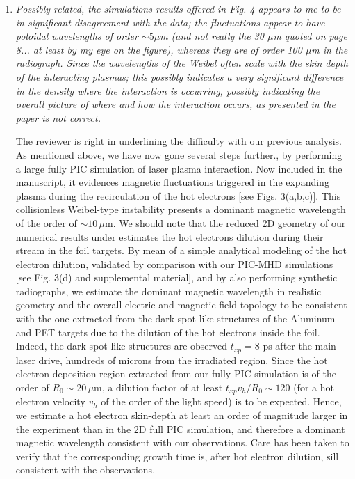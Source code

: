 \documentclass[aps,showpacs,superscriptaddress]{revtex4}%
\begin{document}
\begin{enumerate}
\item \textit{Possibly related, the simulations results offered in Fig. 4 appears to me to be in significant disagreement with the data; the fluctuations appear to have poloidal wavelengths of order $\sim 5 \mu$m (and not really the 30 $\mu$m quoted on page 8... at least by my eye on the figure), whereas they are of order 100 $\mu$m in the radiograph. Since the wavelengths of the Weibel often scale with the skin depth of the interacting plasmas; this possibly indicates a very significant difference in the density where the interaction is occurring, possibly indicating the overall picture of where and how the interaction occurs, as presented in the paper is not correct. }

The reviewer is right in underlining the difficulty with our previous analysis. As mentioned above, we have now gone several steps further., by performing a  large fully PIC simulation of laser plasma interaction. Now included in the manuscript, it evidences magnetic fluctuations triggered in the expanding plasma during the recirculation of the hot electrons [see Figs. 3(a,b,c)]. This collisionless Weibel-type instability presents a dominant magnetic wavelength of the order of $\sim 10 \, \mu$m.
We should note that the reduced 2D geometry of our numerical results under estimates the hot electrons dilution during their stream in the foil targets. 
By mean of a simple analytical modeling of the hot electron dilution, validated by comparison with our PIC-MHD simulations [see Fig. 3(d) and supplemental material], and by also performing synthetic radiographs, we  estimate the  dominant magnetic wavelength in realistic geometry and the overall electric and magnetic field topology to be consistent with the one extracted from the dark spot-like structures of the Aluminum  and PET targets due to the dilution of the hot electrons inside the foil.
Indeed, the dark spot-like structures are observed $t_{xp}   = 8$ ps   after the main laser drive, hundreds of  microns from the irradiated region.
Since the hot electron deposition region extracted from our fully PIC simulation is of the order of $R_0\sim 20\, \mu$m, 
a dilution factor of at least $t_{xp} v_h / R_0 \sim 120$ (for a hot electron velocity $v_h$ of the order of  the light speed) is to be expected. Hence, we estimate a hot electron skin-depth at least  an order of magnitude larger in the experiment than in the 2D full PIC simulation,  and therefore a dominant magnetic wavelength consistent with our observations.
Care has been taken to verify that the corresponding growth time is, after hot electron dilution, sill consistent with the observations.


\end{enumerate}
\end{document}
